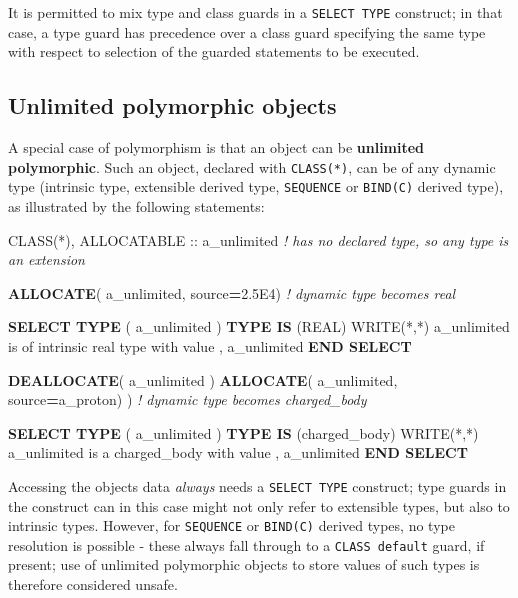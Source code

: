 \documentclass[
]{scrartcl}
\newenvironment{Shaded}{}{}
\newcommand{\CommentTok}[1]{\textcolor[rgb]{0.38,0.63,0.69}{\textit{#1}}}
\newcommand{\DataTypeTok}[1]{\textcolor[rgb]{0.56,0.13,0.00}{#1}}
\newcommand{\FloatTok}[1]{\textcolor[rgb]{0.25,0.63,0.44}{#1}}
\newcommand{\FunctionTok}[1]{\textcolor[rgb]{0.02,0.16,0.49}{#1}}
\newcommand{\KeywordTok}[1]{\textcolor[rgb]{0.00,0.44,0.13}{\textbf{#1}}}
\newcommand{\NormalTok}[1]{#1}
\newcommand{\StringTok}[1]{\textcolor[rgb]{0.25,0.44,0.63}{#1}}
\begin{document}
It is permitted to mix type and class guards in a \texttt{SELECT\ TYPE}
construct; in that case, a type guard has precedence over a class guard
specifying the same type with respect to selection of the guarded
statements to be executed.

\subsection{Unlimited polymorphic
objects}\label{unlimited-polymorphic-objects}

A special case of polymorphism is that an object can be
\textbf{unlimited polymorphic}. Such an object, declared with
\texttt{CLASS(*)}, can be of any dynamic type (intrinsic type,
extensible derived type, \texttt{SEQUENCE} or \texttt{BIND(C)} derived
type), as illustrated by the following statements:

\begin{Shaded}
\begin{Highlighting}[]
\DataTypeTok{CLASS(*)}\NormalTok{, }\DataTypeTok{ALLOCATABLE} \DataTypeTok{::}\NormalTok{ a\_unlimited  }\CommentTok{! has no declared type, so any type is an extension}

\KeywordTok{ALLOCATE}\NormalTok{( a\_unlimited, source}\KeywordTok{=}\FloatTok{2.5}\NormalTok{E4)  }\CommentTok{! dynamic type becomes real}

\KeywordTok{SELECT TYPE}\NormalTok{ ( a\_unlimited )}
\KeywordTok{TYPE IS}\NormalTok{ (}\DataTypeTok{REAL}\NormalTok{)}
   \FunctionTok{WRITE(*}\NormalTok{,}\FunctionTok{*)} \StringTok{\textquotesingle{}a\_unlimited is of intrinsic real type with value \textquotesingle{}}\NormalTok{, a\_unlimited}
\KeywordTok{END SELECT}

\KeywordTok{DEALLOCATE}\NormalTok{( a\_unlimited )}
\KeywordTok{ALLOCATE}\NormalTok{( a\_unlimited, source}\KeywordTok{=}\NormalTok{a\_proton) )  }\CommentTok{! dynamic type becomes charged\_body}

\KeywordTok{SELECT TYPE}\NormalTok{ ( a\_unlimited )}
\KeywordTok{TYPE IS}\NormalTok{ (charged\_body)}
   \FunctionTok{WRITE(*}\NormalTok{,}\FunctionTok{*)} \StringTok{\textquotesingle{}a\_unlimited is a charged\_body with value \textquotesingle{}}\NormalTok{, a\_unlimited}
\KeywordTok{END SELECT}
\end{Highlighting}
\end{Shaded}

Accessing the object\textquotesingle s data \emph{always} needs a
\texttt{SELECT\ TYPE} construct; type guards in the construct can in
this case might not only refer to extensible types, but also to
intrinsic types. However, for \texttt{SEQUENCE} or \texttt{BIND(C)}
derived types, no type resolution is possible - these always fall
through to a \texttt{CLASS\ default} guard, if present; use of unlimited
polymorphic objects to store values of such types is therefore
considered unsafe.
\end{document}
